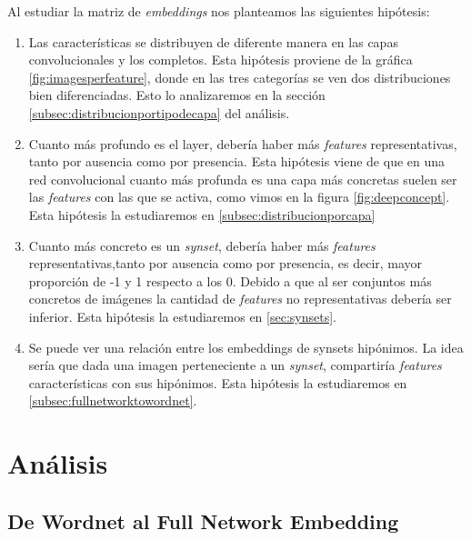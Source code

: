 \documentclass[12,twoside]{TFG-GM}
\theoremstyle{definition}
\theoremstyle{remark}
\begin{document}
Al estudiar la matriz de \textit{embeddings} nos planteamos las siguientes hipótesis: 
\begin{enumerate}
\item \label{h1} Las características se distribuyen de diferente manera en las capas convolucionales y los completos. Esta hipótesis proviene de la gráfica \ref{fig:imagesperfeature}, donde 
en las tres categorías se ven dos distribuciones bien diferenciadas. Esto lo analizaremos en la sección \ref{subsec:distribucionportipodecapa} del análisis.
\item \label{h3} Cuanto más profundo es el layer, debería haber más \textit{features} representativas, tanto por ausencia como por presencia. Esta hipótesis viene de que en una red convolucional cuanto más profunda es una capa más concretas suelen ser las \textit{features} con las que se activa, como vimos en la figura \ref{fig:deepconcept}. Esta hipótesis la estudiaremos en \ref{subsec:distribucionporcapa}
\item \label{h2} Cuanto más concreto es un \textit{synset}, debería haber más \textit{features} representativas,tanto por ausencia como por presencia, es decir, mayor proporción de -1 y 1 respecto a los 0. Debido a que al ser conjuntos más concretos de imágenes la cantidad de \textit{features} no representativas debería ser inferior. Esta hipótesis la estudiaremos en \ref{sec:synsets}.
\item \label{h4} Se puede ver una relación entre los embeddings de synsets hipónimos. La idea sería que dada una imagen perteneciente a un \textit{synset}, compartiría \textit{features} características con sus hipónimos. Esta hipótesis la estudiaremos en \ref{subsec:fullnetworktowordnet}.
\end{enumerate}


\newpage
\section{Análisis}
\label{sec:analisis}
\subsection{De Wordnet al Full Network Embedding}
%
\end{document}
